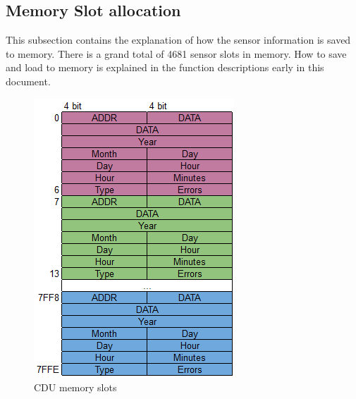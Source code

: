 \subsection{Memory Slot allocation}
This subsection contains the explanation of how the sensor information is saved to memory. There is a grand total of 4681 sensor slots in memory. How to save and load to memory is explained in the function descriptions early in this document.
\begin{figure}[H]
\centering
\includegraphics[scale=1]{billeder/memoryslots}
\caption{CDU memory slots}
\label{fig:memoryslots}
\end{figure}